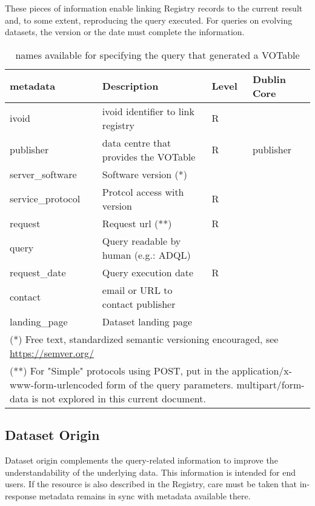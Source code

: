\documentclass[11pt,a4paper]{ivoa}
\begin{document}
These pieces of information enable linking Registry records to the
current result and, to some extent, reproducing the query executed. For
queries on evolving datasets, the version or the date must complete the
information.

\begin{table}
\begin{tabular}{|l|p{5cm}|l|l|}  \hline
\textbf{metadata} & \textbf{Description} & \textbf{Level} & \textbf{Dublin Core}\\ \hline
ivoid             & ivoid identifier to link registry & R &  \\ \hline
publisher         & data centre that provides the VOTable & R & publisher\\ \hline
server\_software  & Software version (*) & & \\ \hline
service\_protocol & Protcol access with version & R& \\ \hline
request           & Request url (**)&  R& \\ \hline
query             & Query readable by human (e.g.: ADQL) &  & \\ \hline
request\_date     & Query execution date & R&\\ \hline	
contact           & email or URL to contact publisher & & \\ \hline	
landing\_page     & Dataset landing page & & \\ \hline
\multicolumn{4}{l}{\footnotesize(*) Free text, standardized semantic versioning encouraged, see \url{https://semver.org/}} \\
\multicolumn{4}{p{\textwidth}}{\footnotesize(**) For "Simple" protocols using POST, put in the application/x-www-form-urlencoded form of the query parameters. multipart/form-data is not explored in this current document.}
\end{tabular}
\caption{ names available for specifying the query that
generated a VOTable}
\label{tab:query-names}
\end{table}




\subsection{Dataset Origin}
Dataset origin complements the query-related information to improve the
understandability of the underlying data. This information is intended
for end users.  If the resource is also described in the Registry, care
must be taken that in-response metadata remains in sync with metadata
available there.
\end{document}
